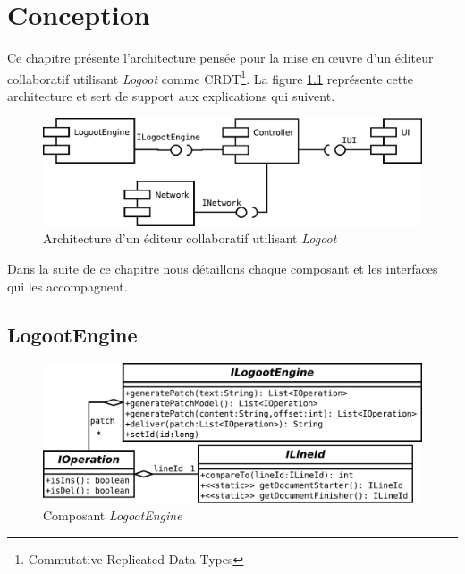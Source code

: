 \chapter{Conception}
  Ce chapitre présente l'architecture pensée pour la mise en \oe{}uvre d'un
  éditeur collaboratif utilisant \emph{Logoot} comme CRDT\footnote{Commutative
  Replicated Data Types}. La figure \ref{fig:architecture} représente cette
  architecture et sert de support aux explications qui suivent.

  \begin{figure}[hbt]
    \label{fig:architecture}
    \includegraphics[width=\textwidth]{includes/architecture.pdf}
    \caption{Architecture d'un éditeur collaboratif utilisant \emph{Logoot}}
  \end{figure}

  Dans la suite de ce chapitre nous détaillons chaque composant et les
  interfaces qui les accompagnent.

  \section{LogootEngine}
  \begin{figure}[hbt]
    \center
    \label{fig:logootengine}
    \includegraphics[width=.7\textwidth]{includes/model/ILogootEngine.pdf}
    \caption{Composant \emph{LogootEngine}}
  \end{figure}

